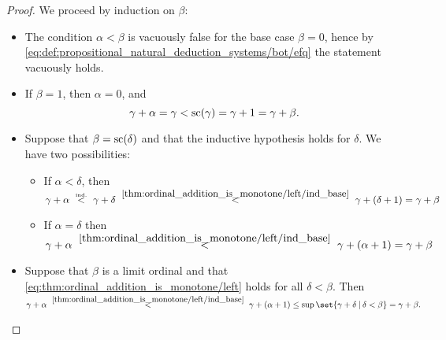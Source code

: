\begin{proof}
   We proceed by induction on \( \beta \):
  \begin{itemize}
    \item The condition \( \alpha < \beta \) is vacuously false for the base case \( \beta = 0 \), hence by \eqref{eq:def:propositional_natural_deduction_systems/bot/efq} the statement vacuously holds.

    \item If \( \beta = 1 \), then \( \alpha = 0 \), and
    \begin{equation}\label{thm:ordinal_addition_is_monotone/left/ind_base}
      \gamma + \alpha = \gamma < \op{sc}(\gamma) = \gamma + 1 = \gamma + \beta.
    \end{equation}

    \item Suppose that \( \beta = \op{sc}(\delta) \) and that the inductive hypothesis holds for \( \delta \). We have two possibilities:
    \begin{itemize}
      \item If \( \alpha < \delta \), then
      \begin{equation*}
        \gamma + \alpha
        \reloset {\T{ind.}} <
        \gamma + \delta
        \reloset {\eqref{thm:ordinal_addition_is_monotone/left/ind_base}} <
        \gamma + (\delta + 1)
        =
        \gamma + \beta
      \end{equation*}

      \item If \( \alpha = \delta \) then
      \begin{equation*}
        \gamma + \alpha
        \reloset {\eqref{thm:ordinal_addition_is_monotone/left/ind_base}} <
        \gamma + (\alpha + 1)
        =
        \gamma + \beta
      \end{equation*}
    \end{itemize}

    \item Suppose that \( \beta \) is a limit ordinal and that \eqref{eq:thm:ordinal_addition_is_monotone/left} holds for all \( \delta < \beta \). Then
    \begin{equation*}
      \gamma + \alpha
      \reloset {\eqref{thm:ordinal_addition_is_monotone/left/ind_base}} <
      \gamma + (\alpha + 1)
      \leq
      \sup\set{ \gamma + \delta \given \delta < \beta }
      =
      \gamma + \beta.
    \end{equation*}
  \end{itemize}


\end{proof}
